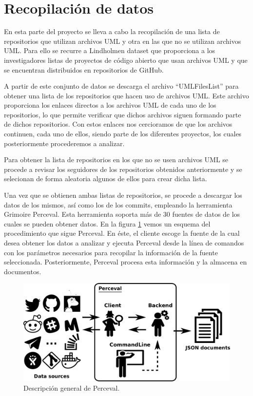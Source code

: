 \documentclass[a4paper, 12pt]{book}
\begin{document}
\section{Recopilación de datos} %
\label{sec:recopilación de datos}

En esta parte del proyecto se lleva a cabo la recopilación de una lista de repositorios que utilizan archivos UML y otra en las que no se utilizan archivos UML.
Para ello se recurre a Lindholmen dataset que proporciona a los investigadores listas de proyectos de código abierto que usan archivos UML y que se encuentran distribuidos en repositorios de GitHub.

A partir de este conjunto de datos se descarga el archivo ``UMLFilesList'' para obtener una lista de los repositorios que hacen uso de archivos UML.
Este archivo proporciona los enlaces directos a los archivos UML de cada uno de los repositorios, lo que permite verificar que dichos archivos siguen formando parte de dichos repositorios.
Con estos enlaces nos cercioramos de que los archivos continuen, cada uno de ellos, siendo parte de los diferentes proyectos, los cuales posteriormente procederemos a analizar. 


Para obtener la lista de repositorios en los que no se usen archivos UML se procede a revisar los seguidores de los repositorios obtenidos anteriormente y se selecionan de forma aleatoria algunos de ellos para crear dicha lista.


Una vez que se obtienen ambas listas de repositorios, se procede a descargar los datos de los mismos, así como los de los commits, empleando la herramienta Grimoire Perceval.
Esta herramienta soporta más de 30 fuentes de datos de los cuales se pueden obtener datos.
En la figura \ref{fig:perceval-json} vemos un esquema del procedimiento que sigue Perceval. 
En éste, el cliente escoge la fuente de la cual desea obtener los datos a analizar y ejecuta Perceval desde la línea de comandos con los parámetros necesarios para recopilar la información de la fuente seleccionada.
Posteriormente, Perceval procesa esta información y la almacena en documentos. 

\begin{figure}
  \centering
  \includegraphics[width=12cm, keepaspectratio]{img/perceval-json.png}
  \caption{Descripción general de Perceval.}\label{fig:perceval-json}
\end{figure}
\end{document}
